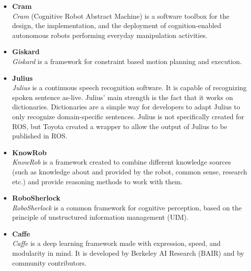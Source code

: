 \documentclass[main.tex]{subfiles}
\begin{document}
			\begin{itemize}
				\item{\textbf{Cram}} \\
					 \textit{Cram} (Cognitive Robot Abstract Machine) is a software toolbox for the design, the implementation, and the deployment of cognition-enabled autonomous robots performing everyday manipulation activities.
				\item{\textbf{Giskard}} \\
					\textit{Giskard} is a  framework for constraint based motion planning and execution.
				\item{\textbf{Julius}} \\
					\textit{Julius} is a continuous speech recognition software. It is capable of recognizing spoken sentence as-live. Julius' main strength is the fact that it works on dictionaries. Dictionaries are a simple way for developers to adapt Julius to only recognize domain-specific sentences. Julius is not specifically created for ROS, but Toyota created a wrapper to allow the output of Julius to be published in ROS.
				\item{\textbf{KnowRob}} \\
				    \textit{KnowRob} is a framework created to combine different knowledge sources (such as knowledge about and provided by the robot, common sense, research etc.) and provide reasoning methods to work with them. 
				\item{\textbf{RoboSherlock}} \\
					\textit{RoboSherlock} is a common framework for cognitive perception, based on the principle of unstructured information management (UIM).
				\item{\textbf{Caffe}} \\
					\textit{Caffe} is a deep learning framework made with expression, speed, and modularity in mind. It is developed by Berkeley AI Research (BAIR) and by community contributors.
			\end{itemize}
			
	

		
\end{document}
